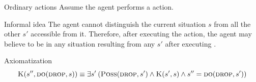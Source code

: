 \begin{frame}{Ordinary actions}
    Assume the agent performs a  action.

    \begin{block}{Informal idea}
        The agent cannot distinguish the current situation \(s\) from all the other
        \(s'\) accessible from it. Therefore, after executing the action,
        the agent may believe to be in any situation resulting from any \(s'\) after executing .
    \end{block}

    \begin{block}{Axiomatization}
        \[ \textsc{K}(s'', \textsc{do}(\textsc{drop}, s)) \equiv \exists s' \: (\textsc{Poss}(\textsc{drop}, s') \land \textsc{K}(s',s) \land s'' = \textsc{do}(\textsc{drop}, s')) \]
    \end{block}
\end{frame}







